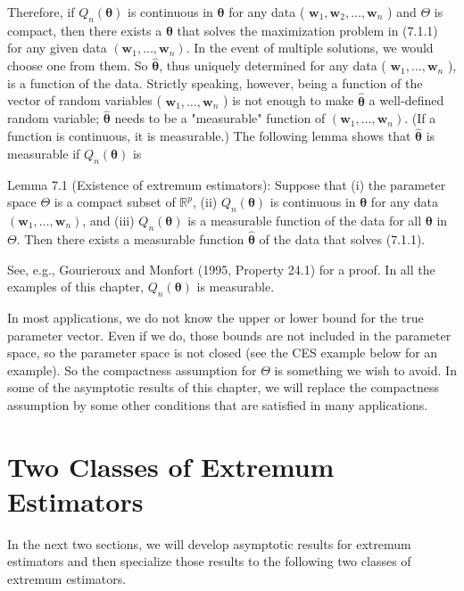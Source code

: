 \documentclass[10pt]{article}
\begin{document}
Therefore, if $Q_{n}(\boldsymbol{\theta})$ is continuous in $\boldsymbol{\theta}$ for any data ( $\mathbf{w}_{1}, \mathbf{w}_{2}, \ldots, \mathbf{w}_{n}$ ) and $\Theta$ is compact, then there exists a $\boldsymbol{\theta}$ that solves the maximization problem in (7.1.1) for any given data $\left(\mathbf{w}_{1}, \ldots, \mathbf{w}_{n}\right)$. In the event of multiple solutions, we would choose one from them. So $\hat{\boldsymbol{\theta}}$, thus uniquely determined for any data ( $\mathbf{w}_{1}, \ldots, \mathbf{w}_{n}$ ), is a function of the data. Strictly speaking, however, being a function of the vector of random variables ( $\mathbf{w}_{1}, \ldots, \mathbf{w}_{n}$ ) is not enough to make $\hat{\boldsymbol{\theta}}$ a well-defined random variable; $\hat{\boldsymbol{\theta}}$ needs to be a "measurable" function of $\left(\mathbf{w}_{1}, \ldots, \mathbf{w}_{n}\right)$. (If a function is continuous, it is measurable.) The following lemma shows that $\hat{\boldsymbol{\theta}}$ is measurable if $Q_{n}(\boldsymbol{\theta})$ is

Lemma 7.1 (Existence of extremum estimators): Suppose that (i) the parameter space $\Theta$ is a compact subset of $\mathbb{R}^{p}$, (ii) $Q_{n}(\boldsymbol{\theta})$ is continuous in $\boldsymbol{\theta}$ for any data $\left(\mathbf{w}_{1}, \ldots, \mathbf{w}_{n}\right)$, and (iii) $Q_{n}(\boldsymbol{\theta})$ is a measurable function of the data for all $\boldsymbol{\theta}$ in $\Theta$. Then there exists a measurable function $\hat{\boldsymbol{\theta}}$ of the data that solves (7.1.1).

See, e.g., Gourieroux and Monfort (1995, Property 24.1) for a proof. In all the examples of this chapter, $Q_{n}(\boldsymbol{\theta})$ is measurable.

In most applications, we do not know the upper or lower bound for the true parameter vector. Even if we do, those bounds are not included in the parameter space, so the parameter space is not closed (see the CES example below for an example). So the compactness assumption for $\Theta$ is something we wish to avoid. In some of the asymptotic results of this chapter, we will replace the compactness assumption by some other conditions that are satisfied in many applications.

\section*{Two Classes of Extremum Estimators}
In the next two sections, we will develop asymptotic results for extremum estimators and then specialize those results to the following two classes of extremum estimators.
\end{document}
